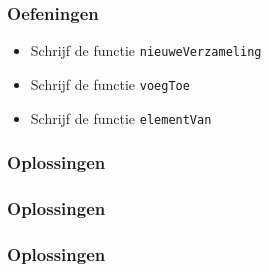 \begin{frame}
  \frametitle{Oefeningen}
  \begin{itemize}
    \item Schrijf de functie {\tt nieuweVerzameling}
    \item Schrijf de functie {\tt voegToe}
    \item Schrijf de functie {\tt elementVan}
  \end{itemize}
\end{frame}

\begin{frame}
  \frametitle{Oplossingen}
\end{frame}

\begin{frame}
  \frametitle{Oplossingen}
\end{frame}

\begin{frame}
  \frametitle{Oplossingen}
\end{frame}

